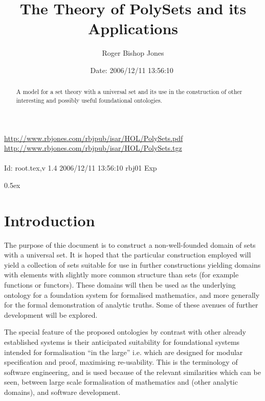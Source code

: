 \documentclass[11pt,a4paper]{article}
\begin{document}
\title{The Theory of PolySets and its Applications}

\author{Roger Bishop Jones}
\date{$ $Date: 2006/12/11 13:56:10 $ $}
\maketitle

\begin{abstract}
A model for a set theory with a universal set and its use in the construction of other interesting and possibly useful foundational ontologies.
\end{abstract}

\vfill
\begin{centering}
{\footnotesize
\href{http://www.rbjones.com/rbjpub/isar/HOL/PolySets.pdf}{http://www.rbjones.com/rbjpub/isar/HOL/PolySets.pdf}\\
\href{http://www.rbjones.com/rbjpub/isar/HOL/PolySets.tgz}{http://www.rbjones.com/rbjpub/isar/HOL/PolySets.tgz}\\
\ \\
$ $Id: root.tex,v 1.4 2006/12/11 13:56:10 rbj01 Exp $ $\\
}%
\end{centering}

\newpage

\tableofcontents

\parindent 0pt\parskip 0.5ex
\newpage
\section{Introduction}

The purpose of thie document is to construct a non-well-founded domain of sets with a universal set.
It is hoped that the particular construction employed will yield a collection of sets suitable for use in further constructions yielding domains with elements with slightly more common structure than sets (for example functions or functors).
These domains will then be used as the underlying ontology for a foundation system for formalised mathematics, and more generally for the formal demonstration of analytic truths.
Some of these avenues of further development will be explored.

The special feature of the proposed ontologies by contrast with other already established systems is their anticipated suitability for foundational systems intended for formalisation ``in the large'' i.e. which are designed for modular specification and proof, maximising re-usability.
This is the terminology of software engineering, and is used because of the relevant similarities which can be seen, between large scale formalisation of mathematics and (other analytic domains), and software development.
\end{document}
